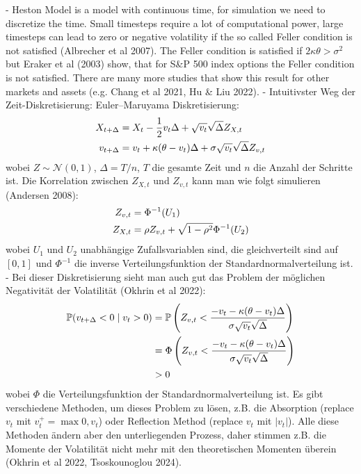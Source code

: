- Heston Model is a model with continuous time, for simulation we need to discretize the time. Small timesteps require a lot of computational power, large timesteps can lead to zero or negative volatility if the so called Feller condition is not satisfied (Albrecher et al 2007). The Feller condition is satisfied if $2\kappa\theta > \sigma^2$ but Eraker et al (2003) show, that for S&P 500 index options the Feller condition is not satisfied. There are many more studies that show this result for other markets and assets (e.g. Chang et al 2021, Hu & Liu 2022).
- Intuitivster Weg der Zeit-Diskretisierung: Euler–Maruyama Diskretisierung:
\begin{align}
    X_{t+\Delta} &= X_t - \frac{1}{2}v_t\Delta + \sqrt{v_t}\sqrt{\Delta}Z_{X,t} \notag \\
    v_{t+\Delta} &= v_t + \kappa(\theta - v_t)\Delta + \sigma\sqrt{v_t}\sqrt{\Delta}Z_{v,t} \notag
\end{align}
wobei $Z\sim\mathcal{N}(0,1)$, $\Delta = T/n$, $T$ die gesamte Zeit und $n$ die Anzahl der Schritte ist. Die Korrelation zwischen $Z_{X,t}$ und $Z_{v,t}$ kann man wie folgt simulieren (Andersen 2008): %
\begin{align}
    Z_{v,t} &= \Phi^{-1}(U_1) \notag \\
    Z_{X,t} &= \rho Z_{v,t} + \sqrt{1-\rho^2}\Phi^{-1}(U_2) \notag
\end{align}
wobei $U_1$ und $U_2$ unabhängige Zufallsvariablen sind, die gleichverteilt sind auf $[0,1]$ und $\Phi^{-1}$ die inverse Verteilungsfunktion der Standardnormalverteilung ist.
- Bei dieser Diskretisierung sieht man auch gut das Problem der möglichen Negativität der Volatilität (Okhrin et al 2022):
\begin{align}
    \mathbb{P}(v_{t+\Delta}<0 \mid v_t>0) &= \mathbb{P}\left(Z_{v,t} < \frac{-v_t-\kappa(\theta-v_t)\Delta}{\sigma\sqrt{v_t}\sqrt{\Delta}}\right) \notag \\
    &= \Phi\left(Z_{v,t} < \frac{-v_t-\kappa(\theta-v_t)\Delta}{\sigma\sqrt{v_t}\sqrt{\Delta}}\right) \notag \\
    &> 0 \notag
\end{align}
wobei $\Phi$ die Verteilungsfunktion der Standardnormalverteilung ist. Es gibt verschiedene Methoden, um dieses Problem zu lösen, z.B. die Absorption (replace $v_t$ mit $v_t^+ = \max{0, v_t}$) oder Reflection Method (replace $v_t$ mit $\vert v_t\vert$). Alle diese Methoden ändern aber den unterliegenden Prozess, daher stimmen z.B. die Momente der Volatilität nicht mehr mit den theoretischen Momenten überein (Okhrin et al 2022, Tsoskounoglou 2024). 
